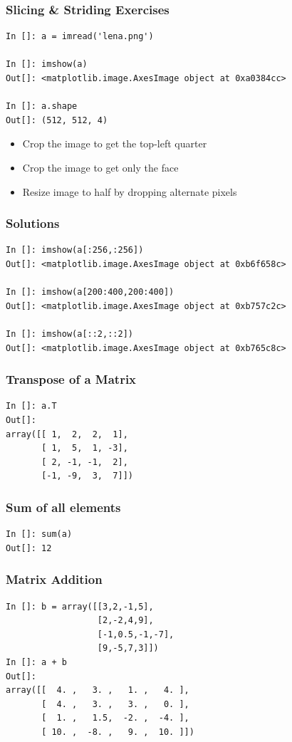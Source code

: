 \documentclass[14pt,compress]{beamer}
\begin{document}
\begin{frame}[fragile]
  \frametitle{Slicing \& Striding Exercises}
\begin{small}
  \begin{lstlisting}
In []: a = imread('lena.png')

In []: imshow(a)
Out[]: <matplotlib.image.AxesImage object at 0xa0384cc>

In []: a.shape 
Out[]: (512, 512, 4)
  \end{lstlisting}
\end{small}
  \begin{itemize}
  \item Crop the image to get the top-left quarter
  \item Crop the image to get only the face
  \item Resize image to half by dropping alternate pixels
  \end{itemize}
\end{frame}

\begin{frame}[fragile]
  \frametitle{Solutions}
\begin{small}
  \begin{lstlisting}
In []: imshow(a[:256,:256])
Out[]: <matplotlib.image.AxesImage object at 0xb6f658c>

In []: imshow(a[200:400,200:400])
Out[]: <matplotlib.image.AxesImage object at 0xb757c2c>

In []: imshow(a[::2,::2])
Out[]: <matplotlib.image.AxesImage object at 0xb765c8c>
  \end{lstlisting}
\end{small}
\end{frame}

\begin{frame}[fragile]
\frametitle{Transpose of a Matrix}
\begin{lstlisting}
In []: a.T
Out[]:
array([[ 1,  2,  2,  1],
       [ 1,  5,  1, -3],
       [ 2, -1, -1,  2],
       [-1, -9,  3,  7]])
\end{lstlisting}
\end{frame}

\begin{frame}[fragile]
  \frametitle{Sum of all elements}
  \begin{lstlisting}
In []: sum(a)
Out[]: 12
  \end{lstlisting}
\end{frame}

\begin{frame}[fragile]
  \frametitle{Matrix Addition}
  \begin{lstlisting}
In []: b = array([[3,2,-1,5],
                  [2,-2,4,9],
                  [-1,0.5,-1,-7],
                  [9,-5,7,3]])
In []: a + b
Out[]: 
array([[  4. ,   3. ,   1. ,   4. ],
       [  4. ,   3. ,   3. ,   0. ],
       [  1. ,   1.5,  -2. ,  -4. ],
       [ 10. ,  -8. ,   9. ,  10. ]])
  \end{lstlisting}
\end{frame}
\end{document}
